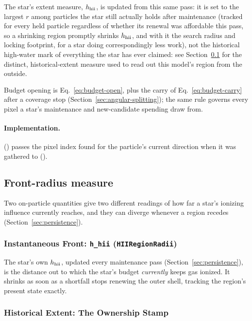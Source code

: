 The star's extent measure, $h_{\rm hii}$, is updated from this same
pass: it is set to the largest $r$ among particles the star still
actually holds after maintenance (tracked for every held particle
regardless of whether its renewal was affordable this pass, so a
shrinking region promptly shrinks $h_{\rm hii}$, and with it the
search radius and locking footprint, for a star doing correspondingly
less work), not the historical high-water mark of everything the star
has ever claimed: see Section~\ref{sec:front-radius} for the
distinct, historical-extent measure used to read out this model's
region from the outside.

Budget opening is Eq.~\ref{eq:budget-open}, plus the carry of
Eq.~\eqref{eq:budget-carry} after a coverage stop
(Section~\ref{sec:angular-splitting}); the
same rule governs every pixel a star's maintenance and new-candidate
spending draw from.

\paragraph{Implementation.} 
() passes the pixel index found
for the particle's current direction when it was gathered to
().

\subsection{Front-radius measure}
\label{sec:front-radius}

Two on-particle quantities give two different readings of how far a
star's ionizing influence currently reaches, and they can diverge
whenever a region recedes (Section~\ref{sec:persistence}).

\subsubsection{Instantaneous Front: \texttt{h\_hii} (\texttt{HIIRegionRadii})}

The star's own $h_{\rm hii}$, updated every maintenance pass
(Section~\ref{sec:persistence}), is the distance out to which the
star's budget \emph{currently} keeps gas ionized. It shrinks as soon
as a shortfall stops renewing the outer shell, tracking the region's
present state exactly.

\subsubsection{Historical Extent: The Ownership Stamp}

